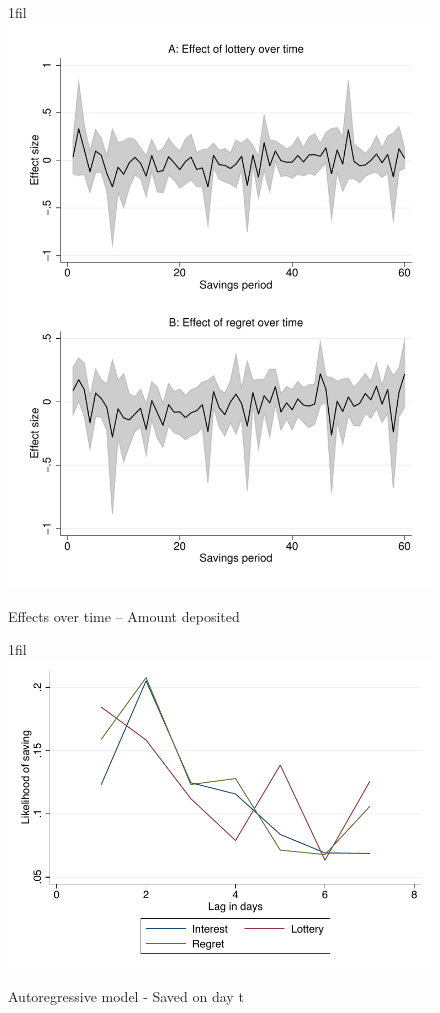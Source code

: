 \documentclass[11pt]{article}
\makeatletter
\newcommand*{\centerfloat}{%
  \parindent \z@
  \leftskip \z@ \@plus 1fil \@minus \textwidth
  \rightskip\leftskip
  \parfillskip \z@skip}
\makeatother
\begin{document}
        \begin{figure}[h]
        \centering
        \caption{Effects over time -- Amount deposited}
        \centerfloat
        \includegraphics[width=\textwidth]{../../figures/line-timemobile_depositamount.pdf}
        \end{figure}

		\begin{figure}[h]
		\centering
		\caption{Autoregressive model - Saved on day t}
		\centerfloat
		\includegraphics[width=\textwidth]{../../figures/line-ar.pdf}
		\end{figure}
\end{document}
